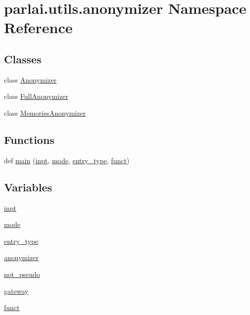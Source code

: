 \hypertarget{namespaceparlai_1_1utils_1_1anonymizer}{}\section{parlai.\+utils.\+anonymizer Namespace Reference}
\label{namespaceparlai_1_1utils_1_1anonymizer}
\subsection*{Classes}
\begin{DoxyCompactItemize}
\item 
class \hyperlink{classparlai_1_1utils_1_1anonymizer_1_1Anonymizer}{Anonymizer}
\item 
class \hyperlink{classparlai_1_1utils_1_1anonymizer_1_1FullAnonymizer}{Full\+Anonymizer}
\item 
class \hyperlink{classparlai_1_1utils_1_1anonymizer_1_1MemoriesAnonymizer}{Memories\+Anonymizer}
\end{DoxyCompactItemize}
\subsection*{Functions}
\begin{DoxyCompactItemize}
\item 
def \hyperlink{namespaceparlai_1_1utils_1_1anonymizer_a388eedb16f0bdab16de2cdf114c81ed3}{main} (\hyperlink{namespaceparlai_1_1utils_1_1anonymizer_a19b0b7197789b0733b2f634f8f953d1e}{inpt}, \hyperlink{namespaceparlai_1_1utils_1_1anonymizer_a1acd04b5f7a8b43a6fe7a1de59906c65}{mode}, \hyperlink{namespaceparlai_1_1utils_1_1anonymizer_a98b333c1fc69d26c1d5940dacc2a41f8}{entry\+\_\+type}, \hyperlink{namespaceparlai_1_1utils_1_1anonymizer_addfbf956944824344200d1b52b62d2a4}{funct})
\end{DoxyCompactItemize}
\subsection*{Variables}
\begin{DoxyCompactItemize}
\item 
\hyperlink{namespaceparlai_1_1utils_1_1anonymizer_a19b0b7197789b0733b2f634f8f953d1e}{inpt}
\item 
\hyperlink{namespaceparlai_1_1utils_1_1anonymizer_a1acd04b5f7a8b43a6fe7a1de59906c65}{mode}
\item 
\hyperlink{namespaceparlai_1_1utils_1_1anonymizer_a98b333c1fc69d26c1d5940dacc2a41f8}{entry\+\_\+type}
\item 
\hyperlink{namespaceparlai_1_1utils_1_1anonymizer_a7ebd07808048c2e238fe70c539aff744}{anonymizer}
\item 
\hyperlink{namespaceparlai_1_1utils_1_1anonymizer_a46d3ffd88ee0831ece60734925380d89}{not\+\_\+pseudo}
\item 
\hyperlink{namespaceparlai_1_1utils_1_1anonymizer_ac44caf57d65464ea135b2564bbdbf8cc}{gateway}
\item 
\hyperlink{namespaceparlai_1_1utils_1_1anonymizer_addfbf956944824344200d1b52b62d2a4}{funct}
\end{DoxyCompactItemize}


